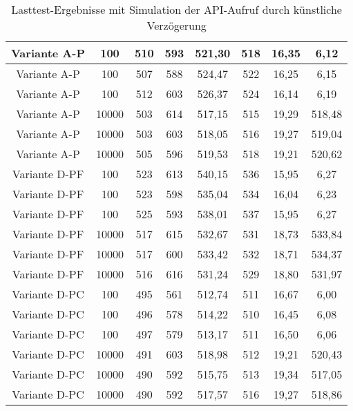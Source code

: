 \begin{landscape}
\begin{table}[h!]
\begin{tabular}{ |c|c|c|c|c|c|c|c|}
			Variante A-P & 100 & 510 & 593 & 521,30 & 518 & 16,35 & 6,12 \\ 
			\hline
			Variante A-P & 100 & 507 & 588 & 524,47 & 522 & 16,25 & 6,15 \\ 
			\hline
			Variante A-P & 100 & 512 & 603 & 526,37 & 524 & 16,14 & 6,19 \\ 
			\hline
			
			Variante A-P & 10000 & 503 & 614 & 517,15 & 515 & 19,29 & 518,48 \\ 
			\hline
			Variante A-P & 10000 & 503 & 603 & 518,05 & 516 & 19,27 & 519,04 \\ 
			\hline
			Variante A-P & 10000 & 505 & 596 & 519,53 & 518 & 19,21 & 520,62 \\ 
			\hline
			
			Variante D-PF & 100 & 523 & 613 & 540,15 & 536 & 15,95 & 6,27 \\ 
			\hline
			Variante D-PF & 100 & 523 & 598 & 535,04 & 534 & 16,04 & 6,23 \\ 
			\hline
			Variante D-PF & 100 & 525 & 593 & 538,01 & 537 & 15,95 & 6,27 \\ 
			\hline
			
			Variante D-PF & 10000 & 517 & 615 & 532,67 & 531 & 18,73 & 533,84 \\ 
			\hline
			Variante D-PF & 10000 & 517 & 600 & 533,42 & 532 & 18,71 & 534,37 \\ 
			\hline
			Variante D-PF & 10000 & 516 & 616 & 531,24 & 529 & 18,80 & 531,97 \\ 
			\hline
			
			Variante D-PC & 100 & 495 & 561 & 512,74 & 511 & 16,67 & 6,00 \\ 
			\hline
			Variante D-PC & 100 & 496 & 578 & 514,22 & 510 & 16,45 & 6,08 \\ 
			\hline
			Variante D-PC & 100 & 497 & 579 & 513,17 & 511 & 16,50 & 6,06 \\ 
			\hline
			
			Variante D-PC & 10000 & 491 & 603 & 518,98 & 512 & 19,21 & 520,43 \\ 
			\hline
			Variante D-PC & 10000 & 490 & 592 & 515,75 & 513 & 19,34 & 517,05 \\ 
			\hline
			Variante D-PC & 10000 & 490 & 592 & 517,57 & 516 & 19,27 & 518,86 \\ 
			\hline
		\end{tabular}
	\caption{Lasttest-Ergebnisse mit Simulation der API-Aufruf durch künstliche Verzögerung}
	\label{fig:performance-delay}
	\end{table}
\end{landscape}